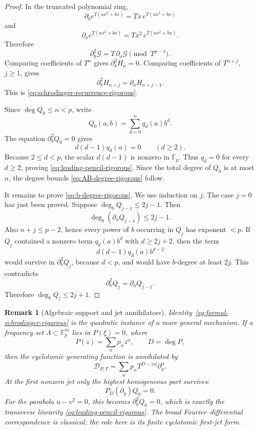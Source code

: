 \documentclass[11pt]{article}
\newtheorem{remark}[theorem]{Remark}
\newcommand{\F}{\mathbb F}
\begin{document}
\begin{proof}
In the truncated polynomial ring,
\[
 \partial_b e^{T(a x^2+b x)}
 =
 Tx\,e^{T(a x^2+b x)}
\]
and
\[
 \partial_a e^{T(a x^2+b x)}
 =
 Tx^2\,e^{T(a x^2+b x)}.
\]
Therefore
\begin{equation}
 \partial_b^2\mathcal G
 =
 T\,\partial_a\mathcal G
 \pmod{T^{p-1}}.
 \label{eq:formal-schrodinger-rigorous}
\end{equation}
Comparing coefficients of \(T^n\) gives
\(\partial_b^2H_n=0\).  Comparing coefficients of
\(T^{n+j}\), \(j\ge1\), gives
\[
 \partial_b^2H_{n+j}
 =
 \partial_aH_{n+j-1}.
\]
This is \eqref{eq:schrodinger-recurrence-rigorous}.

Since \(\deg Q_0\le n<p\), write
\[
 Q_0(a,b)=\sum_{d=0}^{n}q_d(a)b^d.
\]
The equation \(\partial_b^2Q_0=0\) gives
\[
 d(d-1)q_d(a)=0
 \qquad(d\ge2).
\]
Because \(2\le d<p\), the scalar \(d(d-1)\) is nonzero in \(\F_p\).
Thus \(q_d=0\) for every \(d\ge2\), proving
\eqref{eq:leading-pencil-rigorous}.  Since the total degree of \(Q_0\)
is at most \(n\), the degree bounds
\eqref{eq:AB-degree-rigorous} follow.

It remains to prove \eqref{eq:b-degree-rigorous}.  We use induction on
\(j\).  The case \(j=0\) has just been proved.  Suppose
\(\deg_bQ_{j-1}\le2j-1\).  Then
\[
 \deg_b(\partial_aQ_{j-1})\le2j-1.
\]
Also \(n+j\le p-2\), hence every power of \(b\) occurring in \(Q_j\)
has exponent \(<p\).  If \(Q_j\) contained a nonzero term
\(q_d(a)b^d\) with \(d\ge2j+2\), then the term
\[
 d(d-1)q_d(a)b^{d-2}
\]
would survive in \(\partial_b^2Q_j\), because \(d<p\), and would have
\(b\)-degree at least \(2j\).  This contradicts
\[
 \partial_b^2Q_j=\partial_aQ_{j-1}.
\]
Therefore \(\deg_bQ_j\le2j+1\).
\end{proof}

\begin{remark}[Algebraic support and jet annihilators]
\label{rem:general-jet-annihilator}
Identity~\eqref{eq:formal-schrodinger-rigorous} is the quadratic
instance of a more general mechanism.  If a frequency set
\(\Lambda\subset\F_p^m\) lies in \(P(\xi)=0\), where
\[
 P(z)=\sum_\alpha p_\alpha z^\alpha,\qquad D=\deg P,
\]
then the cyclotomic generating function is annihilated by
\[
 \mathcal D_{P,T}
 =
 \sum_\alpha
 p_\alpha T^{D-|\alpha|}\partial_y^\alpha.
\]
At the first nonzero jet only the highest homogeneous part survives:
\[
 P_D(\partial_y)Q_0=0.
\]
For the parabola \(u-v^2=0\), this becomes
\(\partial_b^2Q_0=0\), which is exactly the transverse linearity
\eqref{eq:leading-pencil-rigorous}.  The broad
Fourier--differential correspondence is classical; the role here is
its finite cyclotomic first-jet form.
\end{remark}
\end{document}
